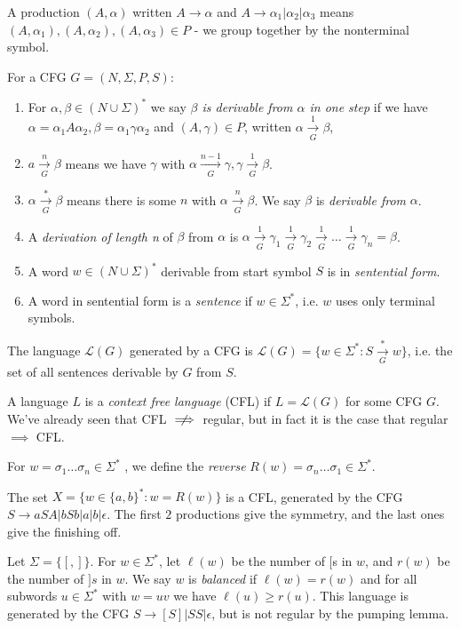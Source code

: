 \documentclass[10pt,a4paper]{article}
\begin{document}
A production $(A, \alpha)$ written $A \to \alpha$ and $A \to \alpha_1|\alpha_2|\alpha_3$ means $(A, \alpha_1),(A,\alpha_2),(A, \alpha_3) \in P$ - we group together by the nonterminal symbol.

For a CFG $G = (N, \Sigma, P, S)$:
\begin{enumerate}
\item For $\alpha, \beta \in (N \cup \Sigma)^{\ast}$ we say \emph{$\beta$ is derivable from $\alpha$ in one step} if we have $\alpha = \alpha_1 A \alpha_2, \beta = \alpha_1 \gamma \alpha_2$ and $(A, \gamma) \in P$, written $\alpha \xrightarrow[G]{1} \beta$,
\item $a \xrightarrow[G]{n} \beta$ means we have $\gamma$ with $\alpha \xrightarrow[G]{n-1} \gamma, \gamma \xrightarrow[G]{1}\beta$.
\item $\alpha \xrightarrow[G]{\ast} \beta$ means there is some $n$ with $\alpha \xrightarrow[G]{n}\beta$. We say $\beta$ is \emph{derivable from} $\alpha$.
\item A \emph{derivation of length n} of $\beta$ from $\alpha$ is $\alpha \xrightarrow[G]{1} \gamma_1 \xrightarrow[G]{1} \gamma_2 \xrightarrow[G]{1}\ldots\xrightarrow[G]{1} \gamma_n  = \beta$.
\item A word $w \in (N \cup \Sigma)^{\ast}$ derivable from start symbol $S$ is in \emph{sentential form}.
\item A word in sentential form is a \emph{sentence} if $w \in \Sigma^{\ast}$, i.e. $w$ uses only terminal symbols.
\end{enumerate}

The language $\mathcal{L}(G)$ generated by a CFG is $\mathcal{L}(G) = \{w \in \Sigma^{\ast} : S \xrightarrow[G]{\ast} w\}$, i.e. the set of all sentences derivable by $G$ from $S$.

A language $L$ is a \emph{context free language} (CFL) if $L = \mathcal{L}(G)$ for some CFG $G$. We've already seen that CFL $\centernot\implies$ regular, but in fact it is the case that regular $\implies$ CFL.

For $w = \sigma_1 \ldots \sigma_n \in \Sigma^{\ast}$ , we define the \emph{reverse} $R(w) = \sigma_n\ldots\sigma_1 \in \Sigma^{\ast}$.

The set $X = \{w \in \{a,b\}^{\ast} : w = R(w)\}$ is a CFL, generated by the CFG $S \to aSA|bSb|a|b|\epsilon$. The first $2$ productions give the symmetry, and the last ones give the finishing off.

Let $\Sigma = \{[,]\}$. For $w \in \Sigma^{\ast}$, let $\ell(w)$ be the number of $[$s in $w$, and $r(w)$ be the number of $]s$ in $w$. We say $w$ is \emph{balanced} if $\ell(w) = r(w)$ and for all subwords $u \in \Sigma^{\ast}$ with $w = uv$ we have $\ell(u) \geq r(u)$. This language is generated by the CFG $S \to [S]|SS|\epsilon$, but is not regular by the pumping lemma.
\end{document}

